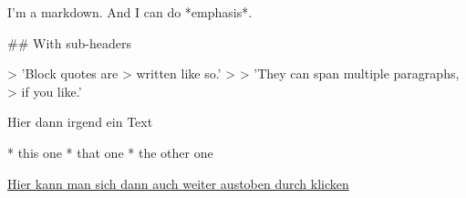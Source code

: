 \begin{markdown}
I'm a markdown.  
And I can do *emphasis*.

## With sub-headers

> 'Block quotes are
> written like so.'
>
> 'They can span multiple paragraphs,
> if you like.'

Hier dann irgend ein Text

* this one
* that one
* the other one

\end{markdown}

\vspace{1cm}
\href{https://www.overleaf.com/learn/how-to/Writing_Markdown_in_LaTeX_Documents}{Hier kann man sich dann auch weiter austoben durch klicken}
